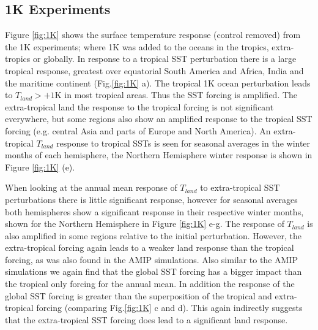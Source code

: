 \subsection{1K Experiments}

Figure \ref{fig:1K} shows the surface temperature response (control removed) 
from the 1K experiments; where 1K was added to the oceans in the tropics, 
extra-tropics or globally. In response to a tropical SST perturbation there is a 
large tropical response, greatest over equatorial South America and Africa, 
India and the maritime continent (Fig.\ref{fig:1K} a). The tropical 1K ocean 
perturbation leads to $T_{land}>+1$K in most tropical areas. Thus the SST 
forcing is amplified. The extra-tropical land the response to the tropical 
forcing is not significant everywhere, but some regions also show an amplified 
response to the tropical SST forcing (e.g. central Asia and parts of Europe and 
North America).  An extra-tropical $T_{land}$ response to tropical SSTs is seen 
for seasonal averages in the winter months of each hemisphere, the Northern 
Hemisphere winter response is shown in Figure \ref{fig:1K} (e).

When looking at the annual mean response of $T_{land}$ to extra-tropical SST 
perturbations there is little significant response, however for seasonal 
averages both hemispheres show a significant response in their respective winter 
months, shown for the Northern Hemisphere in Figure \ref{fig:1K} e-g. The 
response of $T_{land}$ is also amplified in some regions relative to the initial 
perturbation.  However, the extra-tropical forcing again leads to a weaker land 
response than the tropical forcing, as was also found in the AMIP simulations.  
Also similar to the AMIP simulations we again find that the  global SST forcing 
has a bigger impact than the tropical only forcing for the annual mean. In 
addition the response of the global SST forcing is greater than the 
superposition of the tropical and extra-tropical forcing (comparing 
Fig.\ref{fig:1K} c and d).  This again indirectly suggests that the 
extra-tropical SST forcing does lead to a significant land response.

